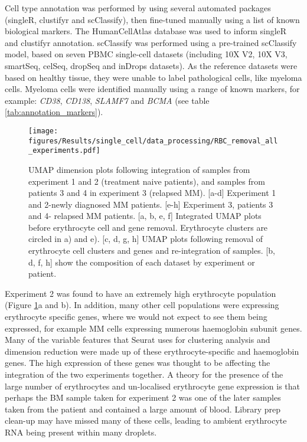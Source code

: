 Cell type annotation was performed by using several automated packages (singleR, clustifyr and scClassify), then fine-tuned manually using a list of known biological markers.
The HumanCellAtlas database was used to inform singleR and clustifyr annotation.
scClassify was performed using a pre-trained scClassify model, based on seven PBMC single-cell datasets (including 10X V2, 10X V3, smartSeq, celSeq, dropSeq and inDrops datasets).
As the reference datasets were based on healthy tissue, they were unable to label pathological cells, like myeloma cells.
Myeloma cells were identified manually using a range of known markers, for example: \textit{CD38}, \textit{CD138}, \textit{SLAMF7} and \textit{BCMA} (see table \ref{tab:annotation_markers}).

\begin{figure}[htb]
    \centering
    \texttt{[image: figures/Results/single\_cell/data\_processing/RBC\_removal\_all\_experiments.pdf]}
    \caption[Erythrocyte removal from integrated scRNA-seq datasets]{UMAP dimension plots following integration of samples from experiment 1 and 2 (treatment naive patients), and samples from patients 3 and 4 in experiment 3 (relapsed MM).
    [a-d] Experiment 1 and 2-newly diagnosed MM patients.
    [e-h] Experiment 3, patients 3 and 4- relapsed MM patients.
     [a, b, e, f] Integrated UMAP plots before erythrocyte cell and gene removal. Erythrocyte clusters are circled in a) and e).
     [c, d, g, h] UMAP plots following removal of erythrocyte cell clusters and genes and re-integration of samples.
     [b, d, f, h] show the composition of each dataset by experiment or patient.}
    \label{fig:umap_RBC}
\end{figure}

Experiment 2 was found to have an extremely high erythrocyte population (Figure \ref{fig:umap_RBC}a and b).
In addition, many other cell populations were expressing erythrocyte specific genes, where we would not expect to see them being expressed, for example MM cells expressing numerous haemoglobin subunit genes.
Many of the variable features that Seurat uses for clustering analysis and dimension reduction were made up of these erythrocyte-specific and haemoglobin genes.
The high expression of these genes was thought to be affecting the integration of the two experiments together.
A theory for the presence of the large number of erythrocytes and un-localised erythrocyte gene expression is that perhaps the BM sample taken for experiment 2 was one of the later samples taken from the patient and contained a large amount of blood.
Library prep clean-up may have missed many of these cells, leading to ambient erythrocyte RNA being present within many droplets.

